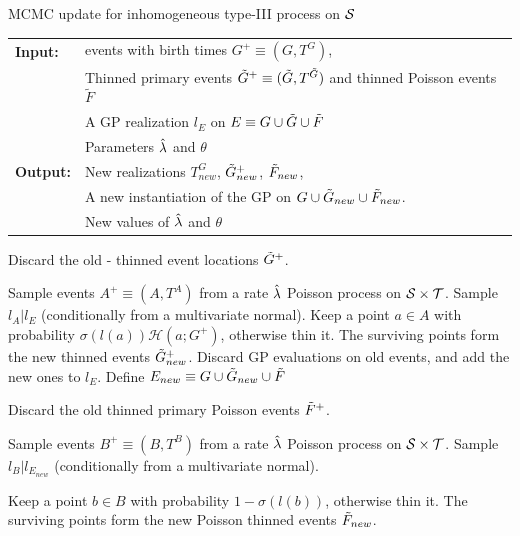 \documentclass{statsoc}
\begin{document}
\begin{algorithm}
{MCMC update for inhomogeneous \matern type-III process on ${\mathcal S}$}
\begin{tabular}{p{1.4cm}p{12.2cm}}
\textbf{Input:}  & \matern events with birth times $G^+ \equiv (G,T^G)$, \\
    & Thinned primary events $\tilde{G}^+ \equiv (\tilde{G},T^{\tilde{G}})$ and thinned Poisson events $\tilde{F}$ \\
    & A GP realization $l_E$ on $E \equiv G \cup \tilde{G} \cup \tilde{F}$\\
    & Parameters $\hat{\lambda}$ and $\theta$  \\
\textbf{Output:} & New realizations $T^G_{new}$, $\tilde{G}_{new}^+$, $\tilde{F}_{new}$, \\
    &  A new instantiation of the GP on $G \cup \tilde{G}_{new} \cup \tilde{F}_{new}$. \\
    &  New values of $\hat{\lambda}$ and $\theta$ \\
\hline 
\end{tabular}
\begin{algorithmic}[1]
\StartG
\State  \begin{minipage}{\textwidth} Discard the old \matern- thinned event locations $\tilde{G}^+$.\end{minipage}
\State Sample events $A^+ \equiv (A, T^A)$ from a rate $\hat{\lambda}$ Poisson process on ${\mathcal S} \times {\mathcal T}$. 
\State Sample $l_A | l_E$ (conditionally from a multivariate normal).
\State Keep a point $a \in A$ with probability $\sigma(l(a)) \mathscr{H}(a;G^+)$, otherwise thin it. 
\State The surviving points form the new \matern thinned events $\tilde{G}^+_{new}$.
\State Discard GP evaluations on old \matern events, and add the new ones to $l_E$.
\EndG
\StartF
\State Define $E_{new} \equiv G \cup \tilde{G}_{new} \cup \tilde{F}$
\State  \begin{minipage}{\textwidth} Discard the old thinned primary Poisson events $\tilde{F}^+$.\end{minipage}
\State Sample events $B^+ \equiv (B, T^B)$ from a rate $\hat{\lambda}$ Poisson process on ${\mathcal S} \times {\mathcal T}$. 
\State Sample $l_B | l_{E_{new}}$ (conditionally from a multivariate normal).
\State  \begin{minipage}{\textwidth} Keep a point $b \in B$ with probability $1 - \sigma(l(b))$, otherwise thin it. 
       The surviving points form the new Poisson thinned events $\tilde{F}_{new}$.\end{minipage}

\end{algorithmic}
\end{algorithm}
\end{document}
